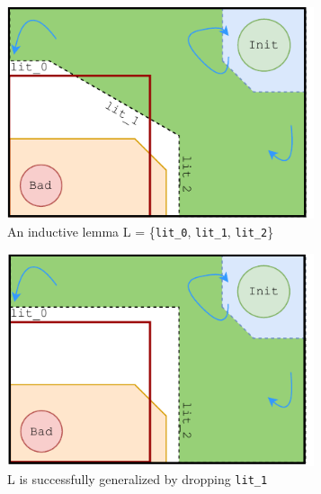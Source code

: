 \begin{figure}[t]
  \centering
  \begin{subfigure}[b]{0.3\textwidth}
    \includegraphics[width=0.99\textwidth]{figures/doping-lemma.pdf}
    \caption{An inductive lemma L = \{\texttt{lit\_0}, \texttt{lit\_1}, \texttt{lit\_2}\}}
    \label{fig:lemma}
	\end{subfigure}
	\begin{subfigure}[b]{0.3\textwidth}
    \includegraphics[width=0.99\textwidth]{figures/doping-lemma_gen.pdf}
    \caption{L is successfully generalized by dropping \texttt{lit\_1}}
    \label{fig:ind_gen}
	\end{subfigure}
	\begin{subfigure}[b]{0.3\textwidth}

\end{subfigure}
\end{figure}
